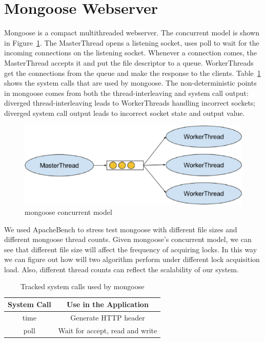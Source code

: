 \section{Mongoose Webserver}

Mongoose is a compact multithreaded webserver. The concurrent model is shown in Figure~\ref{f:mongoose_model}. The MasterThread opens a listening socket, uses poll to wait for the incoming connections on the listening socket. Whenever a connection comes, the MasterThread accepts it and put the file descriptor to a queue. WorkerThreads get the connections from the queue and make the response to the clients. Table~\ref{t:mongoose_syscall} shows the system calls that are used by mongoose. The non-deterministic points in mongoose comes from both the thread-interleaving and system call output: diverged thread-interleaving leads to WorkerThreads handling incorrect sockets; diverged system call output leads to incorrect socket state and output value.

\begin{figure}
\centering
\includegraphics[width=0.6\columnwidth]{figures/mongoose_model}
\caption{mongoose concurrent model}
\label{f:mongoose_model}
\end{figure}

We used ApacheBench to stress test mongoose with different file sizes and different mongoose thread counts. Given mongoose's concurrent model, we can see that different file size will affect the frequency of acquiring locks. In this way we can figure out how will two algorithm perform under different lock acquisition load. Also, different thread counts can reflect the scalability of our system.

\begin{table}
\caption{Tracked system calls used by mongoose}
\begin{center}
 \begin{tabular}{c | c}
System Call & Use in the Application\\ \hline
 time & Generate HTTP header  \\ \hline
 poll & Wait for accept, read and write
 \end{tabular}
\end{center}
\label{t:mongoose_syscall}
\end{table}

